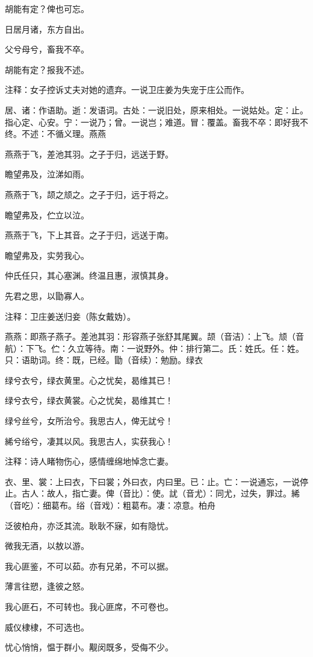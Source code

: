 \documentclass[12pt,UTF8]{ctexbook}
\begin{document}
胡能有定？俾也可忘。

日居月诸，东方自出。

父兮母兮，畜我不卒。

胡能有定？报我不述。

注释：女子控诉丈夫对她的遗弃。一说卫庄姜为失宠于庄公而作。

居、诸：作语助。逝：发语词。古处：一说旧处，原来相处。一说姑处。定：止。指心定、心安。宁：一说乃；曾。一说岂；难道。冒：覆盖。畜我不卒：即好我不终。不述：不循义理。燕燕

燕燕于飞，差池其羽。之子于归，远送于野。

瞻望弗及，泣涕如雨。

燕燕于飞，颉之颃之。之子于归，远于将之。

瞻望弗及，伫立以泣。

燕燕于飞，下上其音。之子于归，远送于南。

瞻望弗及，实劳我心。

仲氏任只，其心塞渊。终温且惠，淑慎其身。

先君之思，以勖寡人。

注释：卫庄姜送归妾（陈女戴妫）。

燕燕：即燕子燕子。差池其羽：形容燕子张舒其尾翼。颉（音洁）：上飞。颃（音航）：下飞。伫：久立等待。南：一说野外。仲：排行第二。氏：姓氏。任：姓。只：语助词。终：既，已经。勖（音续）：勉励。绿衣

绿兮衣兮，绿衣黄里。心之忧矣，曷维其已！

绿兮衣兮，绿衣黄裳。心之忧矣，曷维其亡！

绿兮丝兮，女所治兮。我思古人，俾无訧兮！

絺兮绤兮，凄其以风。我思古人，实获我心！

注释：诗人睹物伤心，感情缠绵地悼念亡妻。

衣、里、裳：上曰衣，下曰裳；外曰衣，内曰里。已：止。亡：一说通忘，一说停止。古人：故人，指亡妻。俾（音比）：使。訧（音尤）：同尤，过失，罪过。絺（音吃）：细葛布。绤（音戏）：粗葛布。凄：凉意。柏舟

泛彼柏舟，亦泛其流。耿耿不寐，如有隐忧。

微我无酒，以敖以游。

我心匪鉴，不可以茹。亦有兄弟，不可以据。

薄言往愬，逢彼之怒。

我心匪石，不可转也。我心匪席，不可卷也。

威仪棣棣，不可选也。

忧心悄悄，愠于群小。觏闵既多，受侮不少。
\end{document}
